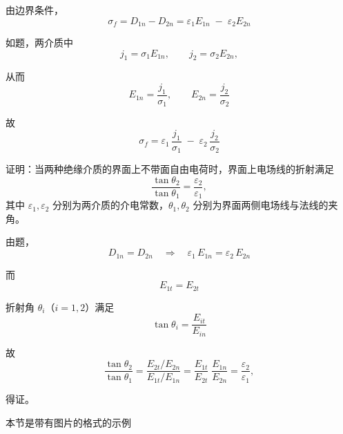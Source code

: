 \documentclass{template}
\begin{document}
\begin{solution}

由边界条件，
\begin{equation}
\sigma_{f}
= D_{1n} - D_{2n}
= \varepsilon_{1}E_{1n} \;-\; \varepsilon_{2}E_{2n} 
\end{equation}

如题，两介质中
\begin{equation}
j_{1} = \sigma_{1}E_{1n},
\qquad
j_{2} = \sigma_{2}E_{2n},
\end{equation}

从而
\begin{equation}
E_{1n} = \frac{j_{1}}{\sigma_{1}},
\qquad
E_{2n} = \frac{j_{2}}{\sigma_{2}} 
\end{equation}

故
\begin{equation}
\sigma_{f}
= \varepsilon_{1}\,\frac{j_{1}}{\sigma_{1}}
  \;-\;
  \varepsilon_{2}\,\frac{j_{2}}{\sigma_{2}} 
\end{equation}
\end{solution}
\begin{problem}
    证明：当两种绝缘介质的界面上不带面自由电荷时，界面上电场线的折射满足
\[
\frac{\tan\theta_2}{\tan\theta_1}=\frac{\varepsilon_2}{\varepsilon_1},
\]
其中 $\varepsilon_1,\varepsilon_2$ 分别为两介质的介电常数，$\theta_1,\theta_2$ 分别为界面两侧电场线与法线的夹角。

\end{problem}
\begin{solution}
    由题，
\begin{equation}
D_{1n}=D_{2n}
\quad\Longrightarrow\quad
\varepsilon_1\,E_{1n}=\varepsilon_2\,E_{2n} 
\end{equation}

而
\begin{equation}
E_{1t}=E_{2t} 
\end{equation}

折射角 $\theta_i$（$i=1,2$）满足
\begin{equation}
\tan\theta_i=\frac{E_{it}}{E_{in}} 
\end{equation}

故
\begin{equation}
\frac{\tan\theta_2}{\tan\theta_1}
=\frac{E_{2t}/E_{2n}}{E_{1t}/E_{1n}}
=\frac{E_{1t}}{E_{2t}}\;\frac{E_{1n}}{E_{2n}}
=\frac{\varepsilon_2}{\varepsilon_1},
\end{equation}

得证。
\end{solution}
\begin{mdframed}
  \centering
    本节是带有图片的格式的示例
\end{mdframed}
\end{document}
